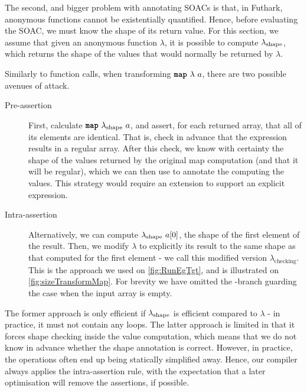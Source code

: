 The second, and bigger problem with annotating SOACs is that, in
Futhark, anonymous functions cannot be existentially quantified.
Hence, before evaluating the SOAC, we must know the shape of its
return value.  For this section, we assume that given an anonymous
function \(\lambda\), it is possible to compute \(\lambda_{\textrm{shape}}\),
which returns the shape of the values that would normally be returned
by \(\lambda\).

Similarly to function calls, when transforming $\mbox{\texttt{\bfseries{map}}}~\lambda~a$,
there are two possible avenues of attack.

\begin{description}
\item[Pre-assertion] First, calculate $\mbox{\texttt{\bfseries{map}}}~\lambda_{\textrm{shape}}~a$, and
  assert, for each returned array, that all of its elements are
  identical. That is, check in advance that the  expression
  results in a regular array.  After this check, we know with
  certainty the shape of the values returned by the original map
  computation (and that it will be regular), which we can then use to
  annotate the  computing the values.  This strategy would
  require an extension to support an explicit  expression.

\item[Intra-assertion] Alternatively, we can compute
  \(\lambda_{\textrm{shape}}~a[0]\), the shape of the first element of the
  result.  Then, we modify $\lambda$ to explicitly  its
  result to the same shape as that computed for the first element - we
  call this modified version \(\lambda_{\textrm{checking}}\).  This is
  the approach we used on \cref{fig:RunEgTgt}, and is illustrated on
  \cref{fig:sizeTransformMap}.  For brevity we have omitted the
  -branch guarding the case when the input array is empty.
\end{description}

The former approach is only efficient if \(\lambda_{\text{\textrm{shape}}}\)
is efficient compared to \(\lambda\) - in practice, it must not
contain any loops.  The latter approach is limited in that it forces
shape checking inside the value computation, which means that we do
not know in advance whether the shape annotation is correct.  However,
in practice, the  operations often end up being statically
simplified away.  Hence, our compiler always applies the
intra-assertion rule, with the expectation that a later optimisation
will remove the assertions, if possible.

